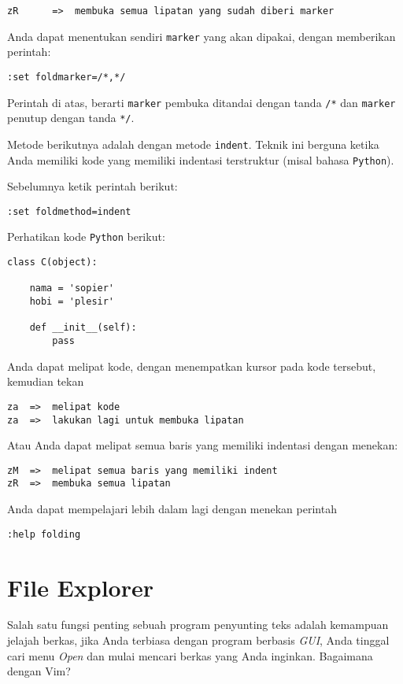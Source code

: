 \documentclass{article}
\begin{document}
\begin{verbatim}
zR      =>  membuka semua lipatan yang sudah diberi marker
\end{verbatim}

Anda dapat menentukan sendiri \verb=marker= yang akan
dipakai, dengan memberikan perintah:

\begin{verbatim}
:set foldmarker=/*,*/
\end{verbatim}

Perintah di atas, berarti \verb=marker= pembuka ditandai
dengan tanda \verb=/*= dan \verb=marker= penutup dengan
tanda \verb=*/=.

Metode berikutnya adalah dengan metode \verb=indent=. Teknik
ini berguna ketika Anda memiliki kode yang memiliki
indentasi terstruktur (misal bahasa \verb=Python=).

Sebelumnya ketik perintah berikut:

\begin{verbatim}
:set foldmethod=indent
\end{verbatim}

Perhatikan kode \verb=Python= berikut:

\begin{verbatim}
class C(object):

    nama = 'sopier'
    hobi = 'plesir'

    def __init__(self):
        pass
\end{verbatim}

Anda dapat melipat kode, dengan menempatkan kursor pada kode
tersebut, kemudian tekan

\begin{verbatim}
za  =>  melipat kode
za  =>  lakukan lagi untuk membuka lipatan
\end{verbatim}

Atau Anda dapat melipat semua baris yang memiliki indentasi
dengan menekan:

\begin{verbatim}
zM  =>  melipat semua baris yang memiliki indent
zR  =>  membuka semua lipatan
\end{verbatim}

Anda dapat mempelajari lebih dalam lagi dengan menekan
perintah 

\begin{verbatim}
:help folding
\end{verbatim}

\section{File Explorer}
Salah satu fungsi penting sebuah program penyunting teks
adalah kemampuan jelajah berkas, jika Anda terbiasa dengan
program berbasis \emph{GUI}, Anda tinggal cari menu
\emph{Open} dan mulai mencari berkas yang Anda inginkan.
Bagaimana dengan Vim?
\end{document}
